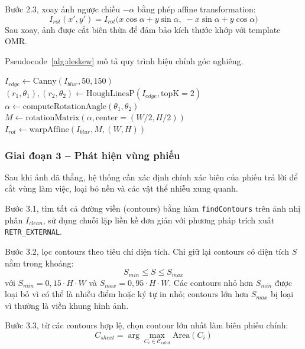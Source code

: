 ﻿\documentclass[../DoAn.tex]{subfiles}
\begin{document}
Bước 2.3, xoay ảnh ngược chiều $-\alpha$ bằng phép affine transformation:
\begin{equation}
    I_{rot}(x',y') = I_{rot}\bigl( x\cos\alpha + y\sin\alpha,\; -x\sin\alpha + y\cos\alpha \bigr)
\end{equation}
Sau xoay, ảnh được cắt biên thừa để đảm bảo kích thước khớp với template OMR.

Pseudocode~\ref{alg:deskew} mô tả quy trình hiệu chỉnh góc nghiêng.

\begin{algorithm}[H]
\caption{Phát hiện và hiệu chỉnh góc nghiêng}
\label{alg:deskew}
\SetAlgoLined
{}
 $I_{edge} \gets \text{Canny}(I_{blur}, 50, 150)$ \;
 $(r_1,\theta_1), (r_2,\theta_2) \gets \text{HoughLinesP}(I_{edge}, \text{topK}=2)$ \;
 $\alpha \gets \text{computeRotationAngle}(\theta_1, \theta_2)$ \;
 $M \gets \text{rotationMatrix}(\alpha, \text{center}=(W/2, H/2))$ \;
 $I_{rot} \gets \text{warpAffine}(I_{blur}, M, (W,H))$ \;
  \;
\end{algorithm}

\subsubsection{Giai đoạn 3 -- Phát hiện vùng phiếu}
Sau khi ảnh đã thẳng, hệ thống cần xác định chính xác biên của phiếu trả lời để cắt vùng làm việc, loại bỏ nền và các vật thể nhiễu xung quanh.

Bước 3.1, tìm tất cả đường viền (contours) bằng hàm \texttt{findContours} trên ảnh nhị phân $I_{clean}$, sử dụng chuỗi lặp liền kề đơn giản với phương pháp trích xuất \texttt{RETR\_EXTERNAL}.

Bước 3.2, lọc contours theo tiêu chí diện tích. Chỉ giữ lại contours có diện tích $S$ nằm trong khoảng:
\begin{equation}
    S_{min} \le S \le S_{max}
\end{equation}
với $S_{min} = 0{,}15 \cdot H \cdot W$ và $S_{max} = 0{,}95 \cdot H \cdot W$. Các contours nhỏ hơn $S_{min}$ được loại bỏ vì có thể là nhiễu điểm hoặc ký tự in nhỏ; contours lớn hơn $S_{max}$ bị loại vì thường là viền khung hình ảnh.

Bước 3.3, từ các contours hợp lệ, chọn contour lớn nhất làm biên phiếu chính:
\begin{equation}
    C_{sheet} = \arg\max_{C_i \in \mathcal{C}_{valid}} \text{Area}(C_i)
\end{equation}
\end{document}
